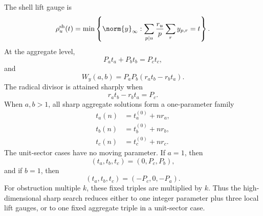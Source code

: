 The shell lift gauge is
\[
 \rho_u^{\mathrm{sh}}(t)
 =
 \min\left\{
 \norm{y}_\infty:
 \sum_{p\mid u}
 \frac{r_u}{p}
 \sum_r y_{p,r}=t
 \right\}.
\]
At the aggregate level,
\[
 P_at_a+P_bt_b=P_ct_c,
\]
and
\[
 W_y(a,b)
 =
 P_aP_b(r_at_b-r_bt_a).
\]
The radical divisor is attained sharply when
\[
 r_at_b-r_bt_a=P_c.
\]
When $a,b>1$, all sharp aggregate solutions form a one-parameter family
\[
 \begin{aligned}
 t_a(n)&=t_a^{(0)}+nr_a,\\
 t_b(n)&=t_b^{(0)}+nr_b,\\
 t_c(n)&=t_c^{(0)}+nr_c.
 \end{aligned}
\]
The unit-sector cases have no moving parameter. If $a=1$, then
\[
 (t_a,t_b,t_c)=(0,P_c,P_b),
\]
and if $b=1$, then
\[
 (t_a,t_b,t_c)=(-P_c,0,-P_a).
\]
For obstruction multiple $k$, these fixed triples are multiplied by $k$. Thus the high-dimensional sharp search reduces either to one integer parameter plus three local lift gauges, or to one fixed aggregate triple in a unit-sector case.

